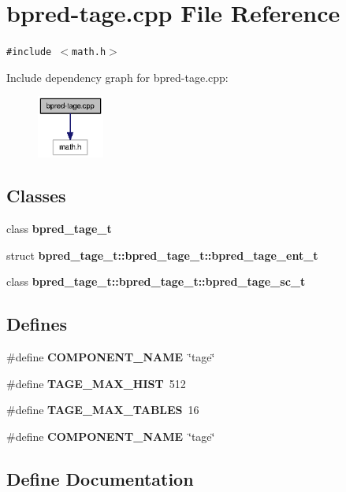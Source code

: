 \section{bpred-tage.cpp File Reference}
\label{bpred-tage_8cpp}
{\tt \#include $<$math.h$>$}\par


Include dependency graph for bpred-tage.cpp:\nopagebreak
\begin{figure}[H]
\begin{center}
\leavevmode
\includegraphics[width=62pt]{bpred-tage_8cpp__incl}
\end{center}
\end{figure}
\subsection*{Classes}
\begin{CompactItemize}
\item 
class {\bf bpred\_\-tage\_\-t}
\item 
struct {\bf bpred\_\-tage\_\-t::bpred\_\-tage\_\-t::bpred\_\-tage\_\-ent\_\-t}
\item 
class {\bf bpred\_\-tage\_\-t::bpred\_\-tage\_\-t::bpred\_\-tage\_\-sc\_\-t}
\end{CompactItemize}
\subsection*{Defines}
\begin{CompactItemize}
\item 
\#define {\bf COMPONENT\_\-NAME}~\char`\"{}tage\char`\"{}
\item 
\#define {\bf TAGE\_\-MAX\_\-HIST}~512
\item 
\#define {\bf TAGE\_\-MAX\_\-TABLES}~16
\item 
\#define {\bf COMPONENT\_\-NAME}~\char`\"{}tage\char`\"{}
\end{CompactItemize}


\subsection{Define Documentation}
